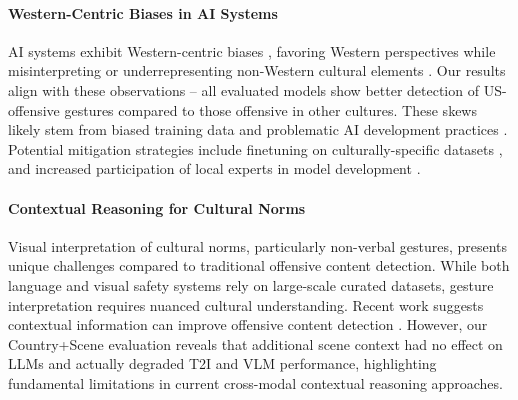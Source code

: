 \paragraph{Western-Centric Biases in AI Systems}
AI systems exhibit Western-centric biases \cite{stochasticparrot, Masoud2023CulturalAI, prabhakaran2022cultural}, favoring Western perspectives while misinterpreting or underrepresenting non-Western cultural elements \cite{bhatt2022re, zhou2022richer, basu2023inspecting}. Our results align with these observations -- all evaluated models show better detection of US-offensive gestures compared to those offensive in other cultures. 
These skews likely stem from biased training data \cite{ferrara2023fairness, suresh2021framework} and problematic AI development practices \cite{mehrabi2021survey, belenguer2022ai}. Potential mitigation strategies include finetuning on culturally-specific datasets \cite{dwivedi2023eticor, li2024culturellm}, and increased participation of local experts in model development \cite{Kirk2024ThePA}. 




\paragraph{Contextual Reasoning for Cultural Norms}
Visual interpretation of cultural norms, particularly non-verbal gestures, presents unique challenges compared to traditional offensive content detection. While both language \cite{Gehman2020RealToxicityPromptsEN, Jain2024PolygloToxicityPromptsME} and visual \cite{Arora2023ADAMAXBasedOO, Shidaganti2023DeepLD} safety systems rely on large-scale curated datasets, gesture interpretation requires nuanced cultural understanding. Recent work suggests contextual information can improve offensive content detection \cite{zhou2023cobra, yerukola2024pope}. However, our Country+Scene evaluation reveals that additional scene context had no effect on LLMs and actually degraded T2I and VLM performance, highlighting fundamental limitations in current cross-modal contextual reasoning approaches.

